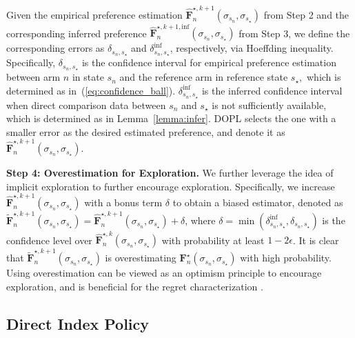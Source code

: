 \documentclass{article} %
\def\eqref#1{equation~\ref{#1}}
\newcommand{\DOPL}{\textsc{DOPL}\xspace}
\newcommand{\I}{\sigma}
\newcommand{\bF}{\mathbf{F}}
\renewcommand{\eqref}[1]{(\ref{#1})}
\begin{document}
Given the empirical preference estimation $\hat{\bF}_n^{\star,k+1}(\I_{s_n}, \I_{s_\star})$ from Step 2 and the corresponding inferred preference $\hat{\bF}_n^{\star,k+1, \text{inf}}(\I_{s_n}, \I_{s_\star})$ from Step 3, we define the corresponding errors as $\delta_{s_n, s_{\star}}$ and $\delta^{\text{inf}}_{s_n, s_{\star}}$, respectively, via Hoeffding inequality. { Specifically, $\delta_{s_n, s_{\star}}$ is the confidence interval for empirical preference estimation between arm $n$ in state $s_n$ and the reference arm in reference state $s_{\star},$ which is determined as in~\eqref{eq:confidence_ball}. $\delta^{\text{inf}}_{s_n, s_{\star}}$ is the inferred confidence interval when direct comparison data between $s_n$ and $s_{\star}$ is not sufficiently available, which is determined as in Lemma~\ref{lemma:infer}.}  \DOPL selects the one with a smaller error as the desired estimated preference, and denote it as $\hat{\bF}_n^{\star, k+1}(\I_{s_n}, \I_{s_\star})$.




\textbf{Step 4: Overestimation for Exploration.} We further leverage the idea of implicit exploration \citep{jin2020provably} to further encourage exploration. Specifically, we increase $\hat{\bF}_n^{\star,k+1}(\I_{s_n}, \I_{s_\star})$ with a bonus term $\delta$ to obtain a biased estimator, denoted as $\tilde{\bF}_n^{\star,k+1}(\I_{s_n}, \I_{s_\star})=\hat{\bF}_n^{\star,k+1}(\I_{s_n}, \I_{s_\star})+\delta$, where $\delta=\min(\delta^{\text{inf}}_{s_n, s_{\star}}, \delta_{s_n, s_{\star}})$ is the confidence level over $\hat{\bF}_{n}^{\star,k}(\I_{s_n}, \I_{s_\star})$ with probability at least $1-2\epsilon$. 
It is clear that $\tilde{\bF}_n^{\star,k+1}(\I_{s_n}, \I_{s_\star})$ is overestimating $\bF_n^{\star}(\I_{s_n}, \I_{s_\star})$ with high probability. Using overestimation can be viewed as an optimism principle to encourage exploration, and is beneficial for the regret characterization \citep{jin2020provably}. 






\subsection{Direct Index Policy}
\label{sec:newLP}
\end{document}

